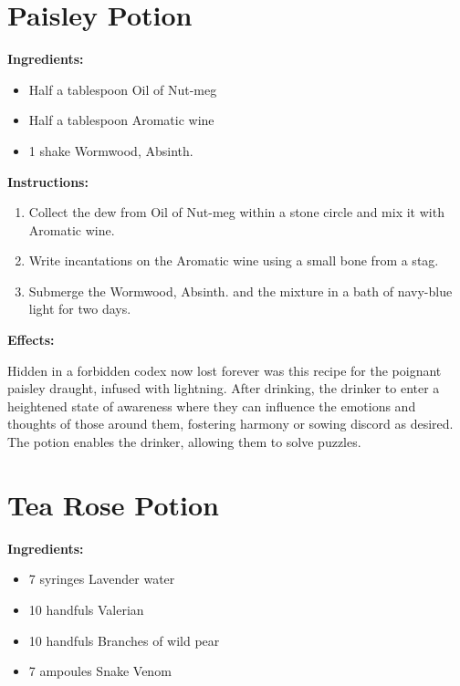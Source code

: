 \documentclass{article}
\begin{document}
\newpage
\section*{Paisley Potion}

\textbf{Ingredients:}

\begin{itemize}
  \item Half a tablespoon Oil of Nut-meg
  \item Half a tablespoon Aromatic wine
  \item 1 shake Wormwood, Absinth.
\end{itemize}

\textbf{Instructions:}

\begin{enumerate}
  \item Collect the dew from Oil of Nut-meg within a stone circle and mix it with Aromatic wine.
  \item Write incantations on the Aromatic wine using a small bone from a stag.
  \item Submerge the Wormwood, Absinth. and the mixture in a bath of navy-blue light for two days.
\end{enumerate}

\textbf{Effects:}

Hidden in a forbidden codex now lost forever was this recipe for the poignant paisley draught, infused with lightning. After drinking, the drinker to enter a heightened state of awareness where they can influence the emotions and thoughts of those around them, fostering harmony or sowing discord as desired. The potion enables the drinker, allowing them to solve puzzles.

\newpage
\section*{Tea Rose Potion}

\textbf{Ingredients:}

\begin{itemize}
  \item 7 syringes Lavender water
  \item 10 handfuls Valerian
  \item 10 handfuls Branches of wild pear
  \item 7 ampoules Snake Venom
\end{itemize}
\end{document}
